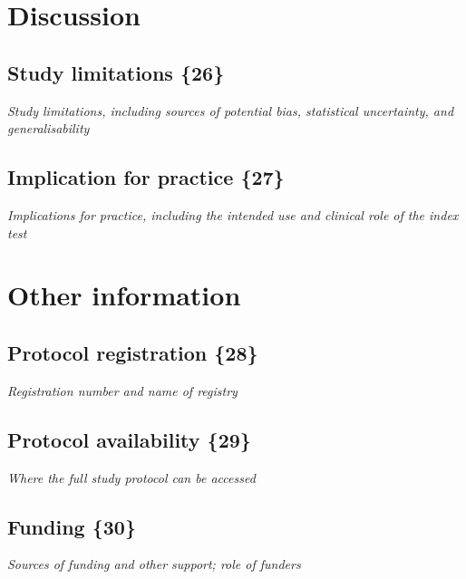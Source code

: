 \section{Discussion}

\subsection{Study limitations \{26\}}

{\em Study limitations, including sources of potential bias,
  statistical uncertainty, and generalisability}

\subsection{Implication for practice \{27\}}

{\em Implications for practice, including the intended use and
  clinical role of the index test}

\section{Other information}

\subsection{Protocol registration \{28\}}

{\em Registration number and name of registry}

\subsection{Protocol availability \{29\}}

{\em Where the full study protocol can be accessed}

\subsection{Funding \{30\}}

{\em Sources of funding and other support; role of funders}

